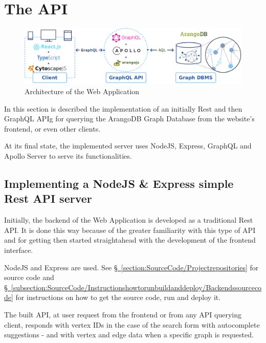 \section[The API]{The \acrshort{API}} \label{section:ImplementingtheWebApp/TheAPI}
\begin{figure}[H]%
		\centering%
		\includegraphics[width=1\textwidth]{images/chapter4/architecture.pdf}%
		\caption[Architecture of the Web Application]{Architecture of the \gls{Web Application}}%
		\label{fig:architecture}%
\end{figure}%

In this section is described the implementation of an initially Rest and then \gls{GraphQL} \gls{APIg} for querying the ArangoDB Graph Database from the website's frontend, or even other clients.

At its final state, the implemented server uses NodeJS, \gls{Express}, \gls{GraphQL} and \gls{Apollo Server} to serve its functionalities.

\subsection[Implementing a NodeJS \& Express simple Rest API server]{Implementing a NodeJS \& \gls{Express} simple Rest \acrshort{API} server} \label{subsection:ImplementingtheWebApp/TheAPI/Implementing a NodeJSExpresssimpleRestAPIserver}
Initially, the backend of the \gls{Web Application} is developed as a traditional Rest \acrshort{API}.
It is done this way because of the greater familiarity with this type of \acrshort{API} and for getting then started straightahead with the development of the frontend interface.

NodeJS and \gls{Express} are used.
See \hyperref[section:SourceCode/Projectrepositories]{\S\ \ref{section:SourceCode/Projectrepositories}} for source code and \hyperref[subsection:SourceCode/Instructionshowtorunbuildanddeploy/Backendssourcecode]{\S\ \ref{subsection:SourceCode/Instructionshowtorunbuildanddeploy/Backendssourcecode}} for instructions on how to get the source code, run and deploy it.

The built \acrshort{API}, at user request from the frontend or from any \acrshort{API} querying client, responds with vertex IDs in the case of the search form with autocomplete suggestions - and with vertex and edge data when a specific graph is requested.

